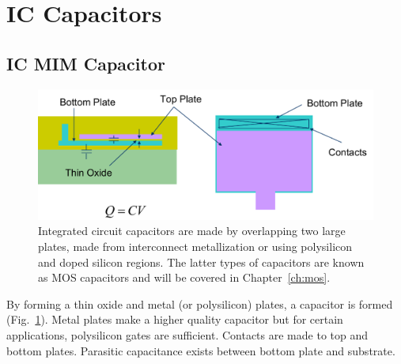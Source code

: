 \section{IC Capacitors}
\subsection{IC MIM Capacitor}
\begin{figure}[tb]
\centering
\includegraphics[width=.75\columnwidth]{mod2-2_ICtech_sld_17}
\caption{Integrated circuit capacitors are made by overlapping two large plates, made from interconnect metallization or using polysilicon and doped silicon regions.  The latter types of capacitors are known as MOS capacitors and will be covered in Chapter~\ref{ch:mos}.}
\label{fig:mod2-2_ICtech_sld_17}
\end{figure}
By forming a thin oxide and metal (or polysilicon) plates, a capacitor is formed (Fig.~\ref{fig:mod2-2_ICtech_sld_17}).  Metal plates make a higher quality capacitor but for certain applications, polysilicon gates are sufficient.   Contacts are made to top and bottom plates.   Parasitic capacitance exists between bottom plate and substrate.
